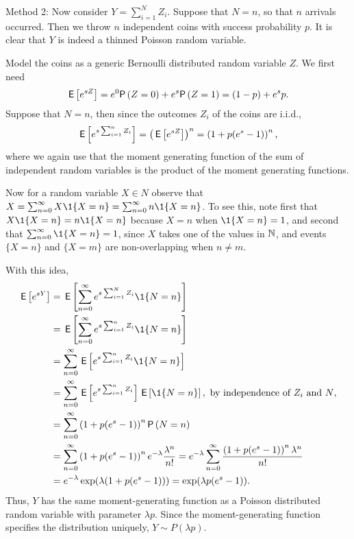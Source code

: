 \begin{exercise}
\begin{solution}
Method 2: Now consider $Y=\sum_{i=1}^N Z_i$. Suppose that $N=n$, so that $n$
arrivals occurred. Then we throw $n$ independent coins with success probability
$p$. It is clear that $Y$ is indeed a thinned Poisson random variable.

Model the coins as a generic Bernoulli distributed random variable
$Z$.  We first need
\begin{equation*}
  \E{e^{s Z}} = e^0 \P{Z=0} + e^{s} \P{Z=1} = (1-p) + e^s p.
\end{equation*}
Suppose that $N=n$, then since the outcomes $Z_i$ of the coins are i.i.d.,
\begin{equation*}
\,\mathsf{E}\left[e^{s\sum_{i=1}^n Z_i}\right] = \left(\,\mathsf{E}\left[e^{s Z}\right]\right)^n = \left(1 + p (e^s - 1)\right)^n,
\end{equation*}
where we again use that the moment generating function of the sum of independent random variables is the product of the moment generating functions.

Now for a random variable $X\in N$ observe that $X=\sum_{n=0}^\infty X\1{X=n} = \sum_{n=0}^\infty n \1{X=n}$. To see this, note first that $X\1{X=n} = n\1{X=n}$ because $X=n$ when $\1{X=n} =1$, and second that $\sum_{n=0}^\infty \1{X=n} =1$, since $X$ takes one of the values in $\mathbb{N}$, and events $\{X=n\}$ and $\{X=m\}$ are non-overlapping when $n\neq m$. 

With this idea, 
\begin{align*}
  \E{e^{s Y}}
&= \E{\sum_{n=0}^\infty e^{s\sum_{i=1}^N Z_i} \1{N=n}} \\
&= \E{\sum_{n=0}^\infty e^{s\sum_{i=1}^n Z_i} \1{N=n}} \\
&= \sum_{n=0}^\infty \E{e^{s\sum_{i=1}^n Z_i} \1{N=n}} \\
&= \sum_{n=0}^\infty \E{e^{s\sum_{i=1}^n Z_i}} \E{\1{N=n}}, \text{ by independence of $Z_i$ and $N$}, \\
&= \sum_{n=0}^\infty \left(1+p(e^s-1)\right)^n \P{N=n} \\
&= \sum_{n=0}^\infty \left(1+p(e^s-1)\right)^n e^{-\lambda} \frac{\lambda^n}{n!}
= e^{-\lambda} \sum_{n=0}^\infty \frac{\left(1+p(e^s-1)\right)^n \lambda^n}{n!}\\
&= e^{-\lambda} \exp(\lambda (1+p(e^s-1))) = \exp(\lambda p (e^s - 1)).
\end{align*}
Thus, $Y$ has the same moment-generating function as a Poisson
distributed random variable with parameter $\lambda p$. Since
the moment-generating function specifies the distribution uniquely,
$Y\sim P(\lambda p)$.
\end{solution}
\end{exercise}    

